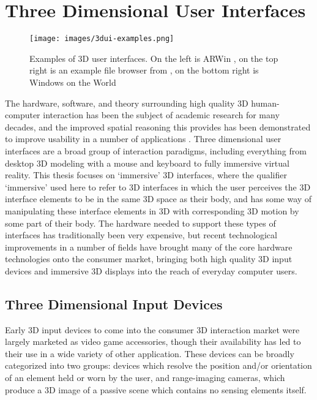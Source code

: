 \section{Three Dimensional User Interfaces}

\begin{figure}[ht!]
\centering
\texttt{[image: images/3dui-examples.png]}
\caption{Examples of 3D user interfaces. On the left is ARWin \protect\cite{arwin}, on the top right is an example file browser from \protect\cite{info-vis}, on the bottom right is Windows on the World \protect\cite{wotw}}
\label{fig:3dui-example}
\end{figure}

The hardware, software, and theory surrounding high quality 3D human-computer interaction has been the subject of academic research for many decades, and the improved spatial reasoning this provides has been demonstrated to improve usability in a  number of applications  \cite{bowman_theory_practice}. Three dimensional user interfaces are a broad group of interaction paradigms, including everything from desktop 3D modeling with a mouse and keyboard to fully immersive virtual reality.  This thesis focuses on ‘immersive' 3D interfaces, where the qualifier `immersive' used here to refer to 3D interfaces in which the user perceives the 3D interface elements to be in the same 3D space as their body, and has some way of manipulating these interface elements in 3D with corresponding 3D motion by some part of their body.  The hardware needed to support these types of interfaces has traditionally been very expensive, but recent technological improvements in a number of fields have brought many of the core hardware technologies onto the consumer market, bringing both high quality 3D input devices and immersive 3D displays into the reach of everyday computer users.

\subsection{Three Dimensional Input Devices}

Early 3D input devices to come into the consumer 3D interaction market were largely marketed as video game accessories, though their availability has led to their use in a wide variety of other application. These devices can be broadly categorized into two groups: devices which resolve the position and/or orientation of an element held or worn by the user, and range-imaging cameras, which produce a 3D image of a passive scene which contains no sensing elements itself.

